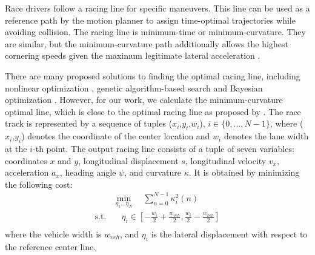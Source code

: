 
Race drivers follow a racing line for specific maneuvers. This line can be used as a reference path by the motion planner to assign time-optimal trajectories while avoiding collision. The racing line is minimum-time or minimum-curvature. They are similar, but the minimum-curvature path additionally allows the highest cornering speeds given the maximum legitimate lateral acceleration \cite{doi:10.1080/00423114.2019.1631455}. 

There are many proposed solutions to finding the optimal racing line, including nonlinear optimization \cite{Rosolia2020LearningHT,doi:10.1080/00423114.2019.1631455}, genetic algorithm-based search \cite{Vesel2015RacingLO} and Bayesian optimization \cite{Jain2020ComputingTR}. However, for our work, we calculate the minimum-curvature optimal line, which is close to the optimal racing line as proposed by \cite{doi:10.1080/00423114.2019.1631455}. 
The race track is represented by a sequence of tuples ($x_i$,$y_i$,$w_i$), $i \in \{0,...,N-1\}$, where ($x_i$,$y_i$) denotes the coordinate of the center location and $w_i$ denotes the lane width at the $i$-th point. The output racing line consists of a tuple of seven variables: coordinates $x$ and $y$, longitudinal displacement $s$, longitudinal velocity $v_x$, acceleration $a_x$, heading angle $\psi$, and curvature $\kappa$. It is obtained by minimizing the following cost:
\begin{equation} \label{opt_racing_line_eqn1}
\begin{split}%
    &  \mathop{\min}\limits_{\eta_1...\eta_N} \quad \sum_{n=0}^{N-1} \kappa_i^2(n)\\
    \text{s.t.} & \quad \eta_i \in \left[ -\frac{w_i}{2}+\frac{w_{veh}}{2},\frac{w_i}{2}-\frac{w_{veh}}{2} \right]\\
\end{split}
\end{equation}
where the vehicle width is $w_{veh}$, and $\eta_i$ is the lateral displacement with respect to the reference center line.

